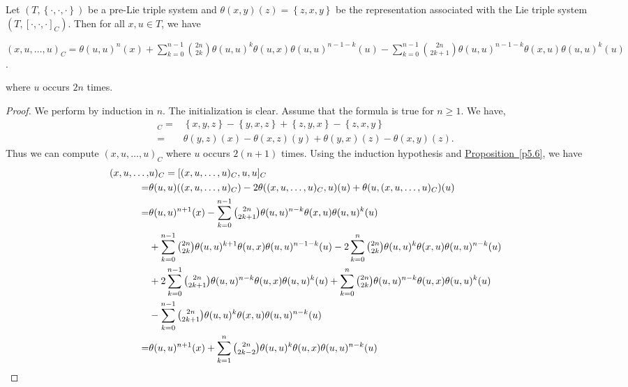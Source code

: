 \documentclass[11pt, twoside]{article}
\begin{document}
\begin{prop}\label{p5.7}
    Let $(T,\left\{ \cdot,\cdot,\cdot\right\}) $ be a pre-Lie triple system and  $\theta(x,y)(z)= \left\{ z,x,y\right\} $ be the representation associated with the Lie triple system $(T,[\cdot,\cdot,\cdot]_C) $. Then for all $x,u\in T$, we have \begin{center}
        $(x,u,\ldots,u)_C= \theta(u,u)^n(x) + \sum\limits_{k=0}^{n-1}\binom{2n}{2k}\theta(u,u)^k\theta(u,x)\theta(u,u)^{n-1-k}(u) - \sum\limits_{k=0}^{n-1}\binom{2n}{2k+1}\theta(u,u)^{n-1-k}\theta(x,u)\theta(u,u)^k(u) $.
    \end{center} where $u$ occurs $2n$ times.
\end{prop}

\begin{proof}
    We perform by induction in $n$. The initialization is clear. Assume that the formula is true for $n\geq 1$. We have,  \begin{align*}
        [x,y,z]_C= &\left\{x,y,z\right\}-\left\{ y,x,z\right\} +  \left\{ z,y,x\right\} -\left\{ z,x,y\right\} \\  =& \theta(y,z)(x) - \theta(x,z)(y) + \theta(y,x)(z) - \theta(x,y)(z). 
    \end{align*} Thus we can compute $(x,u,\ldots,u)_C $ where $u$ occurs $2(n+1)$ times. Using the induction hypothesis and \hyperref[p5.6]{Proposition~\ref*{p5.6}}, we have \begin{align*}
        (x,u,\ldots,&u)_C = [(x,u,\ldots,u)_C,u,u]_C 
        \\ =& \theta(u,u)((x,u,\ldots,u)_C) - 2\theta((x,u,\ldots,u)_C,u)(u) + \theta(u,(x,u,\ldots,u)_C)(u) 
        \\  =&\theta(u,u)^{n+1}(x) - \sum\limits_{k=0}^{n-1}\tbinom{2n}{2k+1}\theta(u,u)^{n-k}\theta(x,u)\theta(u,u)^k(u) 
        \\ &+ \sum\limits_{k=0}^{n-1}\tbinom{2n}{2k}\theta(u,u)^{k+1}\theta(u,x)\theta(u,u)^{n-1-k}(u) -2\sum\limits_{k=0}^n\tbinom{2n}{2k}\theta(u,u)^k\theta(x,u)\theta(u,u)^{n-k}(u)
        \\& +2 \sum\limits_{k=0}^{n-1}\tbinom{2n}{2k+1}\theta(u,u)^{n-k}\theta(u,x)\theta(u,u)^k(u)  + \sum\limits_{k=0}^n\tbinom{2n}{2k}\theta(u,u)^{n-k}\theta(u,x)\theta(u,u)^k(u)
        \\& - \sum\limits_{k=0}^{n-1}\tbinom{2n}{2k+1}\theta(u,u)^k\theta(x,u)\theta(u,u)^{n-k}(u)
        \\ =&  \theta(u,u)^{n+1}(x) + \sum\limits_{k=1}^{n}\tbinom{2n}{2k-2}\theta(u,u)^{k}\theta(u,x)\theta(u,u)^{n-k}(u) 

\end{align*}
\end{proof}
\end{document}
